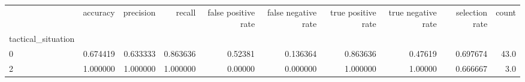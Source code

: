 \begin{tabular}{lrrrrrrrrr}
\toprule
{} &  accuracy &  precision &    recall &  false positive rate &  false negative rate &  true positive rate &  true negative rate &  selection rate &  count \\
tactical\_situation &           &            &           &                      &                      &                     &                     &                 &        \\
\midrule
0                  &  0.674419 &   0.633333 &  0.863636 &              0.52381 &             0.136364 &            0.863636 &             0.47619 &        0.697674 &   43.0 \\
2                  &  1.000000 &   1.000000 &  1.000000 &              0.00000 &             0.000000 &            1.000000 &             1.00000 &        0.666667 &    3.0 \\
\bottomrule
\end{tabular}
